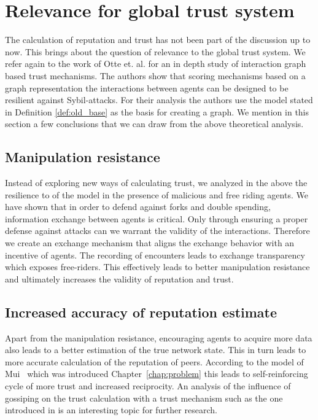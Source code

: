 \section{Relevance for global trust system}
\label{sec:relevance}
The calculation of reputation and trust has not been part of the discussion up to now.
This brings about the question of relevance to the global trust system. We refer again to the work
of Otte et. al. \cite{OTTE2017} for an in depth study of interaction graph based trust mechanisms.
The authors show that scoring mechanisms based on a graph representation the interactions between 
agents can be designed to be resilient against Sybil-attacks. For their analysis the authors use the
model stated in Definition \ref{def:old_base} as the basis for creating a graph. We mention in this
section a few conclusions that we can draw from the above theoretical analysis.

\subsection{Manipulation resistance}
Instead of exploring new ways of calculating trust, we analyzed in the above the resilience to of 
the model in the presence of malicious and free riding agents. We have shown that in order to defend
against forks and double spending, information exchange between agents is critical. Only through
ensuring a proper defense against attacks can we warrant the validity of the interactions. Therefore
we create an exchange mechanism that aligns the exchange behavior with an incentive of agents. The
recording of encounters leads to exchange transparency which exposes free-riders. This effectively 
leads to better manipulation resistance and ultimately increases the validity of reputation and 
trust.

\subsection{Increased accuracy of reputation estimate}
Apart from the manipulation resistance, encouraging agents to acquire more data also leads to a
better estimation of the true network state. This in turn leads to more accurate calculation of 
the reputation of peers. According to the model of Mui~\cite{mui2002computational} which was 
introduced Chapter~\ref{chap:problem} this leads to self-reinforcing cycle of more trust and 
increased reciprocity. An analysis of the influence of gossiping on the trust calculation with a
trust mechanism such as the one introduced in \cite{OTTE2017} is an interesting topic for further 
research.


